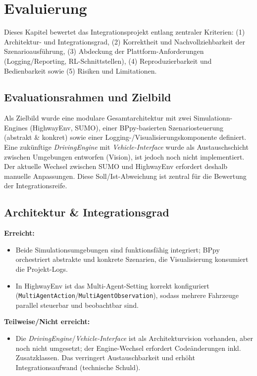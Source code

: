 \chapter{Evaluierung}
\label{chap:evaluierung}

Dieses Kapitel bewertet das Integrationsprojekt entlang zentraler Kriterien:
(1) Architektur- und Integrationsgrad,
(2) Korrektheit und Nachvollziehbarkeit der Szenarioausführung,
(3) Abdeckung der Plattform-Anforderungen (Logging/Reporting, RL-Schnittstellen),
(4) Reproduzierbarkeit und Bedienbarkeit sowie
(5) Risiken und Limitationen.

\section{Evaluationsrahmen und Zielbild}
Als Zielbild wurde eine modulare Gesamtarchitektur mit zwei Simulationn-Engines (HighwayEnv, SUMO), einer BPpy-basierten Szenariosteuerung (abstrakt \& konkret) sowie einer Logging-/Visualisierungskomponente definiert.
Eine zukünftige \emph{DrivingEngine} mit \emph{Vehicle-Interface} wurde als Austauschschicht zwischen Umgebungen entworfen (Vision), ist jedoch noch nicht implementiert.
Der aktuelle Wechsel zwischen SUMO und HighwayEnv erfordert deshalb manuelle Anpassungen.
Diese Soll/Ist-Abweichung ist zentral für die Bewertung der Integrationsreife.

\section{Architektur \& Integrationsgrad}
\textbf{Erreicht:}
\begin{itemize}
  \item Beide Simulationsumgebungen sind funktionsfähig integriert; BPpy orchestriert abstrakte und konkrete Szenarien, die Visualisierung konsumiert die Projekt-Logs.
  \item In HighwayEnv ist das Multi-Agent-Setting korrekt konfiguriert (\texttt{MultiAgentAction}/\texttt{MultiAgentObservation}), sodass mehrere Fahrzeuge parallel steuerbar und beobachtbar sind.
\end{itemize}
\clearpage
\noindent\textbf{Teilweise/Nicht erreicht:}
\begin{itemize}
  \item Die \emph{DrivingEngine}/\emph{Vehicle-Interface} ist als Architekturvision vorhanden, aber noch nicht umgesetzt; der Engine-Wechsel erfordert Codeänderungen inkl. Zusatzklassen. Das verringert Austauschbarkeit und erhöht Integrationsaufwand (technische Schuld).
\end{itemize}

